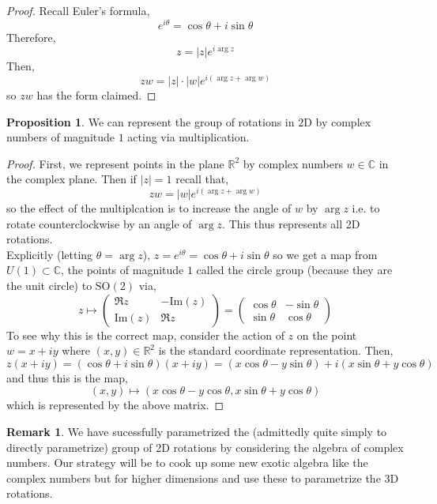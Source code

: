\documentclass[12pt]{extarticle}
\newcommand{\R}{\mathbb{R}}
\renewcommand{\Im}[1]{\mathrm{Im}(#1)}
\theoremstyle{definition}
\newtheorem{proposition}[theorem]{Proposition}
\newtheorem{remark}{Remark}
\newcommand{\SO}[1]{\mathrm{SO}\left(#1\right)}
\newcommand{\C}{\mathbb{C}}
\begin{document}
\begin{proof}
Recall Euler's formula,
\[ e^{i \theta} = \cos{\theta} + i \sin{\theta} \]
Therefore,
\[ z = |z| e^{i \arg{z}} \]
Then,
\[ zw = |z| \cdot |w| e^{i (\arg{z} + \arg{w})} \]
so $zw$ has the form claimed.
\end{proof}

\begin{proposition}
We can represent the group of rotations in 2D by complex numbers of magnitude $1$ acting via multiplication. 
\end{proposition}

\begin{proof}
First, we represent points in the plane $\R^2$ by complex numbers $w \in \C$ in the complex plane. Then if $|z| = 1$ recall that,
\[ zw = |w| e^{i (\arg{z} + \arg{w})} \]
so the effect of the multiplcation is to increase the angle of $w$ by $\arg{z}$ i.e. to rotate counterclockwise by an angle of $\arg{z}$. This thus represents all 2D rotations.
\bigskip\\
Explicitly (letting $\theta = \arg{z}$), $z = e^{i \theta} = \cos{\theta} + i \sin{\theta}$ so we get a map from  $U(1) \subset \C$, the points of magnitude $1$ called the circle group (because they are the unit circle) to $\SO{2}$ via,
\[ z \mapsto 
\begin{pmatrix}
\Re{z} & -\Im{z}
\\
\Im{z} & \Re{z}
\end{pmatrix}
= 
\begin{pmatrix}
\cos{\theta} & - \sin{\theta}
\\
\sin{\theta} & \cos{\theta}
\end{pmatrix} \]
To see why this is the correct map, consider the action of $z$ on the point $w = x + i y$ where $(x,y) \in \R^2$ is the standard coordinate representation. Then,
\[ z(x + i y) = (\cos{\theta} + i \sin{\theta}) (x + i y) = (x \cos{\theta} - y \sin{\theta}) + i(x \sin{\theta} + y \cos{\theta}) \]
and thus this is the map,
\[ (x, y) \mapsto (x \cos{\theta} - y \cos{\theta}, x \sin{\theta} + y \cos{\theta}) \]
which is represented by the above matrix. 
\end{proof}

\begin{remark}
We have sucessfully parametrized the (admittedly quite simply to directly parametrize) group of 2D rotations by considering the algebra of complex numbers. Our strategy will be to cook up some new exotic algebra like the complex numbers but for higher dimensions and use these to parametrize the 3D rotations. 
\end{remark}
\end{document}
